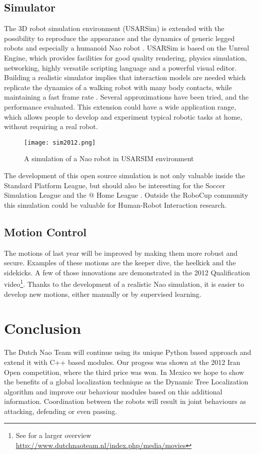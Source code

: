 \documentclass[11pt]{llncs}
\begin{document}
\subsection{Simulator}
The 3D robot simulation environment (USARSim) is extended with the possibility to reproduce the appearance and the dynamics of generic legged robots and especially a humanoid Nao robot \cite{vanNoort2012msc}. USARSim is based on the Unreal Engine, which provides facilities for good quality rendering, physics simulation, networking, highly versatile scripting language and a powerful visual editor. Building a realistic simulator implies that interaction models are needed which replicate the dynamics of a walking robot with many body contacts, while maintaining a fast frame rate \cite{vanNoort2012permis}. Several approximations have been tried, and the performance evaluated. This extension could have a wide application range, which allows people to develop and experiment typical robotic tasks at home, without requiring a real robot.
\begin{figure}[!ht]
\centering
\texttt{[image: sim2012.png]} %
\caption{A simulation of a Nao robot in USARSIM environment}
\end{figure}
The development of this open source simulation is not only valuable inside the Standard Platform League, but should also be interesting for the Soccer Simulation League and the @ Home League \cite{vanNoort2012robocup}. Outside the RoboCup community this simulation could be valuable for Human-Robot Interaction research.
\subsection{Motion Control}
The motions of last year will be improved by making them more robust and secure. Examples of these motions are the keeper dive, the heelkick and the sidekicks. A few of those innovations are demonstrated in the 2012 Qualification video\footnote{See for a larger overview \url{http://www.dutchnaoteam.nl/index.php/media/movies}}. Thanks to the development of a realistic Nao simulation, it is easier to develop new motions, either manually or by supervised learning.
\section{Conclusion}
The Dutch Nao Team will continue using its unique Python based approach and extend it with C++ based modules. Our progess was shown at the 2012 Iran Open competition, 
where the third price was won. In Mexico we hope to show the benefits of a global localization technique as the Dynamic Tree Localization algorithm and improve our behaviour modules based on this additional information.
Coordination between the robots will result in joint behaviours as attacking, defending or even passing.

 
\end{document}
